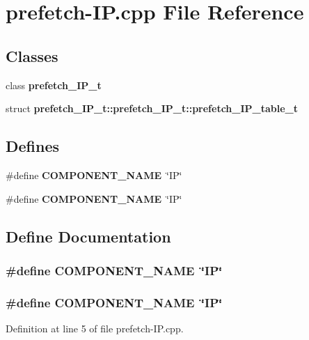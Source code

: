 \section{prefetch-IP.cpp File Reference}
\label{prefetch-IP_8cpp}
\subsection*{Classes}
\begin{CompactItemize}
\item 
class {\bf prefetch\_\-IP\_\-t}
\item 
struct {\bf prefetch\_\-IP\_\-t::prefetch\_\-IP\_\-t::prefetch\_\-IP\_\-table\_\-t}
\end{CompactItemize}
\subsection*{Defines}
\begin{CompactItemize}
\item 
\#define {\bf COMPONENT\_\-NAME}~\char`\"{}IP\char`\"{}
\item 
\#define {\bf COMPONENT\_\-NAME}~\char`\"{}IP\char`\"{}
\end{CompactItemize}


\subsection{Define Documentation}
\subsubsection[{COMPONENT\_\-NAME}]{\setlength{\rightskip}{0pt plus 5cm}\#define COMPONENT\_\-NAME~\char`\"{}IP\char`\"{}}\label{zesto-prefetch_8cpp_9146ade7ce24e3db226a973a59063892}


\subsubsection[{COMPONENT\_\-NAME}]{\setlength{\rightskip}{0pt plus 5cm}\#define COMPONENT\_\-NAME~\char`\"{}IP\char`\"{}}\label{prefetch-IP_8cpp_9146ade7ce24e3db226a973a59063892}




Definition at line 5 of file prefetch-IP.cpp.